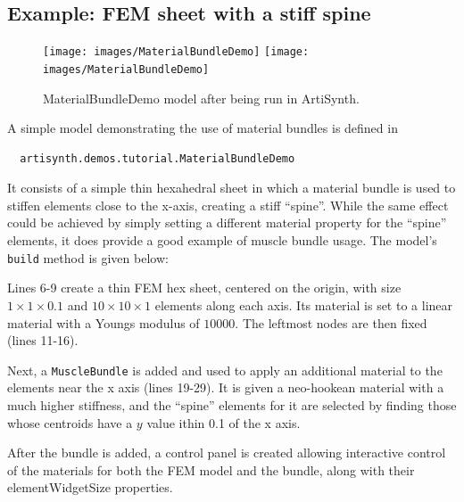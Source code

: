 \subsection{Example: FEM sheet with a stiff spine}
\label{MaterialBundleDemo:sec}

\begin{figure}[ht]
\begin{center}
\iflatexml
 \texttt{[image: images/MaterialBundleDemo]}
\else
 \texttt{[image: images/MaterialBundleDemo]}
\fi
\end{center}
\caption{MaterialBundleDemo model after being run in ArtiSynth.}
\label{MaterialBundleDemo:fig}
\end{figure}

A simple model demonstrating the use of material bundles
is defined in
%
\begin{verbatim}
  artisynth.demos.tutorial.MaterialBundleDemo
\end{verbatim}
%
It consists of a simple thin hexahedral sheet in which a material
bundle is used to stiffen elements close to the x-axis,
creating a stiff ``spine''. While the same effect could be achieved by
simply setting a different material property for the ``spine''
elements, it does provide a good example of muscle bundle usage.
%
The model's {\tt build} method is given below:
\lstset{numbers=left}
\iflatexml

\else

\fi
\lstset{numbers=none}

Lines 6-9 create a thin FEM hex sheet, centered on the origin, with
size $1 \times 1 \times 0.1$ and $10 \times 10 \times 1$ elements
along each axis. Its material is set to a linear material with a
Youngs modulus of $10000$. The leftmost nodes are then fixed (lines
11-16).

Next, a {\tt MuscleBundle} is added and used to apply an additional
material to the elements near the x axis (lines 19-29). It is given a
neo-hookean material with a much higher stiffness, and the ``spine''
elements for it are selected by finding those whose centroids 
have a $y$ value ithin 0.1 of the x axis.

After the bundle is added, a control panel is created allowing
interactive control of the materials for both the FEM model and the
bundle, along with their {\sf elementWidgetSize} properties.

